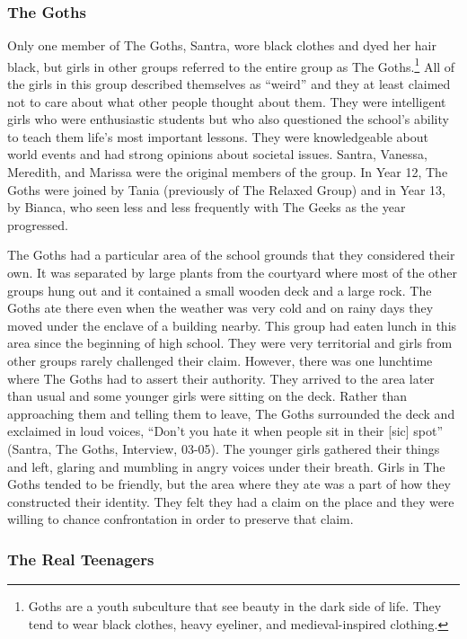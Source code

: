 \subsubsection{The Goths}

Only one member of The Goths, Santra, wore black clothes and dyed her hair black, but girls in other groups referred to the entire group as The Goths.\footnote{Goths are a youth subculture that see beauty in the dark side of life. They tend to wear black clothes, heavy eyeliner, and medieval-inspired clothing.}  All of the girls in this group described themselves as ``weird'' and they at least claimed not to care about what other people thought about them. They were intelligent girls who were enthusiastic students but who also questioned the school's ability to teach them life's most important lessons. They were knowledgeable about world events and had strong opinions about societal issues. Santra, Vanessa, Meredith, and Marissa were the original members of the group. In Year 12, The Goths were joined by Tania (previously of The Relaxed Group) and in Year 13, by Bianca, who seen less and less frequently with The Geeks as the year progressed.

The Goths had a particular area of the school grounds that they considered their own. It was separated by large plants from the courtyard where most of the other groups hung out and it contained a small wooden deck and a large rock. The Goths ate there even when the weather was very cold and on rainy days they moved under the enclave of a building nearby. This group had eaten lunch in this area since the beginning of high school. They were very territorial and girls from other groups rarely challenged their claim. However, there was one lunchtime where The Goths had to assert their authority. They arrived to the area later than usual and some younger girls were sitting on the deck. Rather than approaching them and telling them to leave, The Goths surrounded the deck and exclaimed in loud voices, ``Don't you hate it when people sit in their [sic] spot'' (Santra, The Goths, Interview, 03-05). The younger girls gathered their things and left, glaring and mumbling in angry voices under their breath. Girls in The Goths tended to be friendly, but the area where they ate was a part of how they constructed their identity. They felt they had a claim on the place and they were willing to chance confrontation in order to preserve that claim.


\subsubsection{The Real Teenagers}

